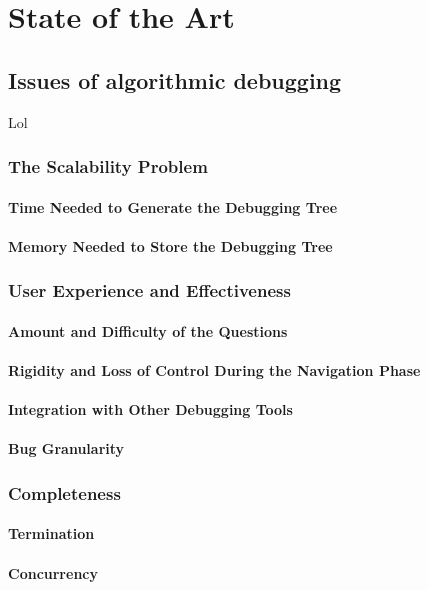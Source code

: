 \chapter{State of the Art}
\label{cap:estadoDeLaCuestion}

\section{Issues of algorithmic debugging}
Lol
\subsection{The Scalability Problem}
\subsubsection{Time Needed to Generate the Debugging Tree}
\subsubsection{Memory Needed to Store the Debugging Tree}
\subsection{User Experience and Effectiveness}
\subsubsection{Amount and Difficulty of the Questions}
\subsubsection{Rigidity and Loss of Control During the Navigation Phase}
\subsubsection{Integration with Other Debugging Tools}
\subsubsection{Bug Granularity}
\subsection{Completeness}
\subsubsection{Termination}
\subsubsection{Concurrency}
